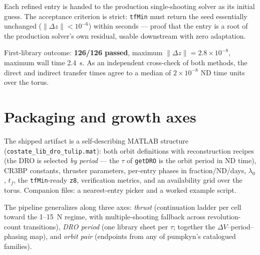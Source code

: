 \documentclass[11pt]{article}
\begin{document}
Each refined entry is handed to the production single-shooting solver as its
initial guess. The acceptance criterion is strict: \texttt{tfMin} must return
the seed essentially unchanged ($\lVert \Delta z\rVert < 10^{-6}$) within
seconds --- proof that the entry is a root of the production solver's own
residual, usable downstream with zero adaptation.

First-library outcome: \textbf{126/126 passed}, maximum $\lVert \Delta
z\rVert = 2.8\times10^{-8}$, maximum wall time 2.4~s. As an independent
cross-check of both methods, the direct and indirect transfer times agree to
a median of $2\times10^{-8}$ ND time units over the torus.

\section{Packaging and growth axes}

The shipped artifact is a self-describing MATLAB structure
(\texttt{costate\_lib\_dro\_tulip.mat}): both orbit definitions with
reconstruction recipes (the DRO is selected \emph{by period} --- the $\tau$
of \texttt{getDRO} is the orbit period in ND time), CR3BP constants, thruster
parameters, per-entry phases in fraction/ND/days, $\lambda_0$, $t_f$, the
\texttt{tfMin}-ready \texttt{z8}, verification metrics, and an availability
grid over the torus. Companion files: a nearest-entry picker and a worked
example script.

The pipeline generalizes along three axes: \emph{thrust} (continuation ladder
per cell toward the 1--15~N regime, with multiple-shooting fallback across
revolution-count transitions), \emph{DRO period} (one library sheet per
$\tau$; together the $\Delta V$--period--phasing map), and \emph{orbit pair}
(endpoints from any of pumpkyn's catalogued families).
\end{document}

